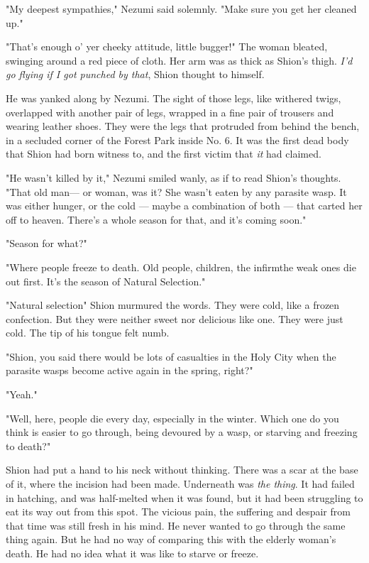 "My deepest sympathies," Nezumi said solemnly. "Make sure you get her
cleaned up."

"That's enough o' yer cheeky attitude, little bugger!" The woman
bleated, swinging around a red piece of cloth. Her arm was as thick as
Shion's thigh. \emph{I'd go flying if I got punched by that}, Shion thought to
himself.

He was yanked along by Nezumi. The sight of those legs, like withered
twigs, overlapped with another pair of legs, wrapped in a fine pair of
trousers and wearing leather shoes. They were the legs that protruded
from behind the bench, in a secluded corner of the Forest Park inside
No. 6. It was the first dead body that Shion had born witness to, and
the first victim that \emph{it} had claimed.

"He wasn't killed by it," Nezumi smiled wanly, as if to read Shion's
thoughts. "That old man--- or woman, was it? She wasn't eaten by any
parasite wasp. It was either hunger, or the cold --- maybe a combination
of both --- that carted her off to heaven. There's a whole season for
that, and it's coming soon."

"Season for what?"

"Where people freeze to death. Old people, children, the infirm\el the
weak ones die out first. It's the season of Natural Selection."

"Natural selection\el " Shion murmured the words. They were cold, like a
frozen confection. But they were neither sweet nor delicious like one.
They were just cold. The tip of his tongue felt numb.

"Shion, you said there would be lots of casualties in the Holy City when
the parasite wasps become active again in the spring, right?"

"Yeah."

"Well, here, people die every day, especially in the winter. Which one
do you think is easier to go through, being devoured by a wasp, or
starving and freezing to death?"

Shion had put a hand to his neck without thinking. There was a scar at
the base of it, where the incision had been made. Underneath was \emph{the
thing}. It had failed in hatching, and was half-melted when it was found,
but it had been struggling to eat its way out from this spot. The
vicious pain, the suffering and despair from that time was still fresh
in his mind. He never wanted to go through the same thing again. But he
had no way of comparing this with the elderly woman's death. He had no
idea what it was like to starve or freeze.

